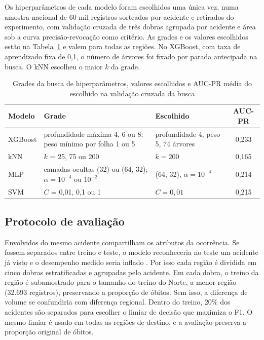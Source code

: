 \documentclass[12pt]{article}
\begin{document}
Os hiperparâmetros de cada modelo foram escolhidos uma única vez, numa
amostra nacional de 60 mil registros sorteados por acidente e retirados
do experimento, com validação cruzada de três dobras agrupada por
acidente e área sob a curva precisão-revocação como critério. As grades
e os valores escolhidos estão na Tabela~\ref{tab:hp} e valem para todas
as regiões. No XGBoost, com taxa de aprendizado fixa de 0,1, o número de
árvores foi fixado por parada antecipada na busca. O kNN escolheu o
maior $k$ da grade.

\begin{table}[H]
\centering
\caption{Grades da busca de hiperparâmetros, valores escolhidos e AUC-PR
média do escolhido na validação cruzada da busca}
\label{tab:hp}
\small
\begin{tabular}{l>{\raggedright\arraybackslash}p{5.6cm}>{\raggedright\arraybackslash}p{3.4cm}c}
\toprule
Modelo & Grade & Escolhido & AUC-PR \\
\midrule
XGBoost & profundidade máxima 4, 6 ou 8; peso mínimo por folha 1 ou 5 & profundidade 4, peso 5, 74 árvores & 0,233 \\
kNN & $k$ = 25, 75 ou 200 & $k = 200$ & 0,165 \\
MLP & camadas ocultas (32) ou (64, 32); $\alpha = 10^{-4}$ ou $10^{-2}$ & (64, 32), $\alpha = 10^{-4}$ & 0,214 \\
SVM & $C$ = 0,01, 0,1 ou 1 & $C = 0{,}01$ & 0,215 \\
\bottomrule
\end{tabular}
\end{table}

\subsection{Protocolo de avaliação}

Envolvidos do mesmo acidente compartilham os atributos da ocorrência.
Se fossem separados entre treino e teste, o modelo reconheceria no teste um
acidente já visto e o desempenho medido seria inflado
\cite{kaufman2012,kapoor2023}.
Por isso cada região é dividida em cinco dobras estratificadas e
agrupadas pelo acidente. Em cada dobra, o treino da região é subamostrado
para o tamanho do treino do Norte, a menor região (32.693 registros),
preservando a proporção de óbitos. Sem isso, a diferença de
volume se confundiria com diferença regional. Dentro do treino, 20\%
dos acidentes são separados para escolher o limiar de decisão que
maximiza o F1. O mesmo limiar é usado em todas as
regiões de destino, e a avaliação preserva a proporção original de
óbitos.
\end{document}
